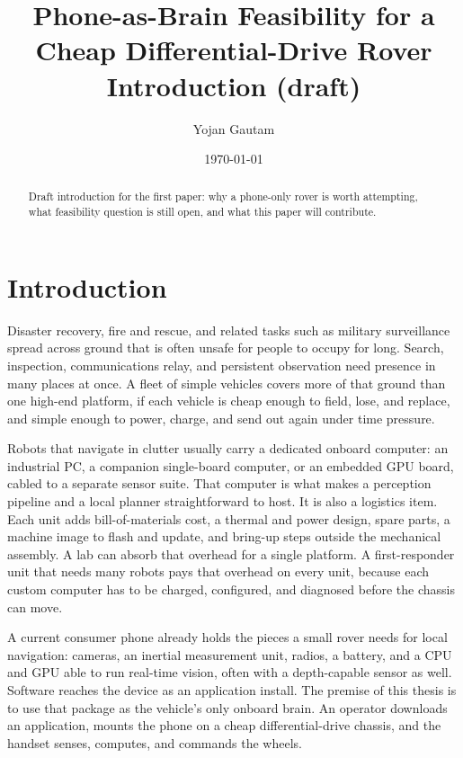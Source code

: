\documentclass[11pt,a4paper]{article}
\title{Phone-as-Brain Feasibility for a Cheap Differential-Drive Rover\\
\large Introduction (draft)}
\author{Yojan Gautam}
\date{\today}
\begin{document}
\maketitle

\begin{abstract}
\noindent
Draft introduction for the first paper: why a phone-only rover is worth attempting, what feasibility question is still open, and what this paper will contribute.
\end{abstract}

\section{Introduction}
\label{sec:introduction}

Disaster recovery, fire and rescue, and related tasks such as military surveillance spread across ground that is often unsafe for people to occupy for long.
Search, inspection, communications relay, and persistent observation need presence in many places at once.
A fleet of simple vehicles covers more of that ground than one high-end platform, if each vehicle is cheap enough to field, lose, and replace, and simple enough to power, charge, and send out again under time pressure.

Robots that navigate in clutter usually carry a dedicated onboard computer: an industrial PC, a companion single-board computer, or an embedded GPU board, cabled to a separate sensor suite.
That computer is what makes a perception pipeline and a local planner straightforward to host.
It is also a logistics item.
Each unit adds bill-of-materials cost, a thermal and power design, spare parts, a machine image to flash and update, and bring-up steps outside the mechanical assembly.
A lab can absorb that overhead for a single platform.
A first-responder unit that needs many robots pays that overhead on every unit, because each custom computer has to be charged, configured, and diagnosed before the chassis can move.

A current consumer phone already holds the pieces a small rover needs for local navigation: cameras, an inertial measurement unit, radios, a battery, and a CPU and GPU able to run real-time vision, often with a depth-capable sensor as well.
Software reaches the device as an application install.
The premise of this thesis is to use that package as the vehicle's only onboard brain.
An operator downloads an application, mounts the phone on a cheap differential-drive chassis, and the handset senses, computes, and commands the wheels.
\end{document}
